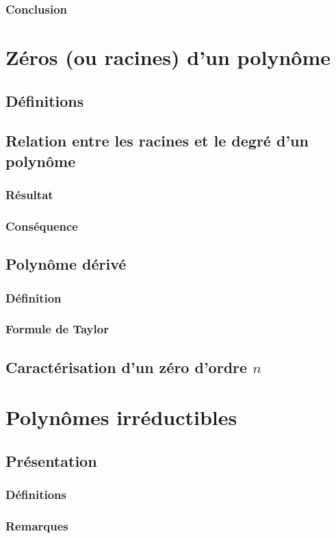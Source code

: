 \documentclass[12pt,a4paper,french]{book}
\begin{document}
			\subsubsection{Conclusion}
	\section{Zéros (ou racines) d'un polynôme}
		\subsection{Définitions}
		\subsection{Relation entre les racines et le degré d'un polynôme}
			\subsubsection{Résultat}
			\subsubsection{Conséquence}
		\subsection{Polynôme dérivé}
			\subsubsection{Définition}
			\subsubsection{Formule de Taylor}
		\subsection{Caractérisation d'un zéro d'ordre $n$}
	\section{Polynômes irréductibles}
		\subsection{Présentation}
			\subsubsection{Définitions}
			\subsubsection{Remarques}
\end{document}
